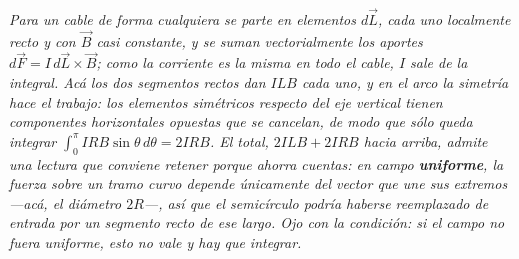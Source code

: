 \begin{center}
\\[0.5em]
{\small\itshape Para un cable de forma cualquiera se parte en elementos
$d\vec L$, cada uno localmente recto y con $\vec B$ casi constante, y se suman
vectorialmente los aportes $d\vec F = I\,d\vec L\times\vec B$; como la corriente
es la misma en todo el cable, $I$ sale de la integral. Acá los dos segmentos
rectos dan $ILB$ cada uno, y en el arco la simetría hace el trabajo: los
elementos simétricos respecto del eje vertical tienen componentes horizontales
opuestas que se cancelan, de modo que sólo queda integrar
$\int_0^{\pi} IRB\sin\theta\,d\theta = 2IRB$. El total, $2ILB + 2IRB$ hacia
arriba, admite una lectura que conviene retener porque ahorra cuentas: en campo
\textbf{uniforme}, la fuerza sobre un tramo curvo depende únicamente del vector
que une sus extremos ---acá, el diámetro $2R$---, así que el semicírculo podría
haberse reemplazado de entrada por un segmento recto de ese largo. Ojo con la
condición: si el campo no fuera uniforme, esto no vale y hay que integrar.}
\end{center}
